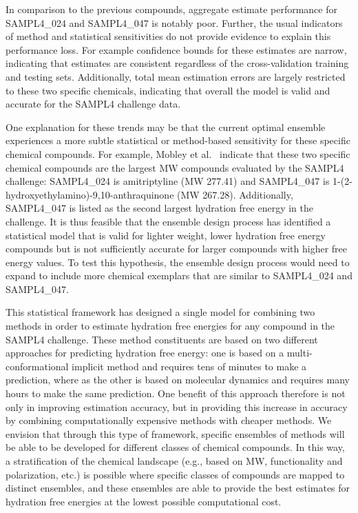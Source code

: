 \documentclass[journal=jpcbfk, manuscript=article]{achemso}
\newcommand{\+}[1]{\ensuremath{\mathbf{#1}}}
\newcommand{\rev}[1]{#1}
\begin{document}
\rev{In comparison to the previous compounds, aggregate estimate performance for SAMPL4\_024 and SAMPL4\_047 is notably poor.
Further, the usual indicators of method and statistical sensitivities do not provide evidence to explain this performance loss.
For example confidence bounds for these estimates are narrow, indicating that estimates are consistent regardless of the cross-validation training and testing sets.
Additionally, total mean estimation errors are largely restricted to these two specific chemicals, indicating that overall the model is valid and accurate for the SAMPL4 challenge data.}
 
\rev{One explanation for these trends may be that the current optimal ensemble experiences a more subtle statistical or method-based sensitivity for these specific chemical compounds. 
For example, Mobley et al.~\cite{Mobley:2014} indicate that these two specific chemical compounds are the largest MW compounds evaluated by the SAMPL4 challenge: SAMPL4\_024 is amitriptyline (MW 277.41) and SAMPL4\_047 is 1-(2-hydroxyethylamino)-9,10-anthraquinone (MW 267.28).
Additionally, SAMPL4\_047 is listed as the second largest hydration free energy in the challenge.
It is thus feasible that the ensemble design process has identified a statistical model that is valid for lighter weight, lower hydration free energy compounds but is not sufficiently accurate for larger compounds with higher free energy values.
To test this hypothesis, the ensemble design process would need to expand to include more chemical exemplars that are similar to SAMPL4\_024 and SAMPL4\_047.}

\rev{This statistical framework has designed a single model for combining two methods in order to estimate hydration free energies for any compound in the SAMPL4 challenge.
These method constituents are based on two different approaches for predicting hydration free energy: one is based on a multi-conformational implicit method and requires tens of minutes to make a prediction, where as the other is based on molecular dynamics and requires many hours to make the same prediction. 
One benefit of this approach therefore is not only in improving estimation accuracy, but in providing this increase in accuracy by combining computationally expensive methods with cheaper methods.
We envision that through this type of framework, specific ensembles of methods will be able to be developed for different classes of chemical compounds.
In this way, a stratification of the chemical landscape (e.g., based on MW, functionality and polarization, etc.) is possible where specific classes of  compounds are mapped to distinct ensembles, and these ensembles are able to provide the best estimates for hydration free energies at the lowest possible computational cost.}
\end{document}
